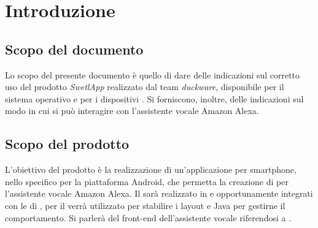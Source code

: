 \clearpage
\section{Introduzione}
\label{sec:sec_introduzione}
\subsection{Scopo del documento}
\label{sec:subsec_scopodocumento}
Lo scopo del presente documento è quello di dare delle indicazioni sul corretto uso del prodotto \textit{SwetlApp} realizzato dal team \textit{duckware}, disponibile per il sistema operativo  e per i dispositivi  . Si forniscono, inoltre, delle indicazioni sul modo in cui si può interagire con l'assistente vocale Amazon Alexa.
\subsection{Scopo del prodotto}
\label{sec:subsec_scopoprodotto}


L'obiettivo del prodotto è la realizzazione di un'applicazione per smartphone, nello specifico per la piattaforma Android, che permetta la creazione di  per l'assistente vocale Amazon Alexa. Il  sarà realizzato in  e  opportunamente integrati con le  di , per il  verrà utilizzato  per stabilire i layout e Java per gestirne il comportamento. Si parlerà del front-end dell'assistente vocale riferendosi a .

